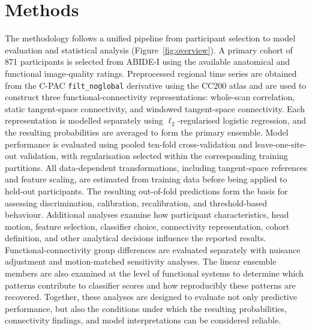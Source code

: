 \section{Methods}
\label{sec:methods}

The methodology follows a unified pipeline from participant selection to model evaluation and statistical analysis (Figure~\ref{fig:overview}). A primary cohort of 871 participants is selected from ABIDE-I using the available anatomical and functional image-quality ratings. Preprocessed regional time series are obtained from the C-PAC \texttt{filt\_noglobal} derivative using the CC200 atlas and are used to construct three functional-connectivity representations: whole-scan correlation, static tangent-space connectivity, and windowed tangent-space connectivity. Each representation is modelled separately using $\ell_2$-regularised logistic regression, and the resulting probabilities are averaged to form the primary ensemble. Model performance is evaluated using pooled ten-fold cross-validation and leave-one-site-out validation, with regularisation selected within the corresponding training partitions. All data-dependent transformations, including tangent-space references and feature scaling, are estimated from training data before being applied to held-out participants. The resulting out-of-fold predictions form the basis for assessing discrimination, calibration, recalibration, and threshold-based behaviour. Additional analyses examine how participant characteristics, head motion, feature selection, classifier choice, connectivity representation, cohort definition, and other analytical decisions influence the reported results. Functional-connectivity group differences are evaluated separately with nuisance adjustment and motion-matched sensitivity analyses. The linear ensemble members are also examined at the level of functional systems to determine which patterns contribute to classifier scores and how reproducibly these patterns are recovered. Together, these analyses are designed to evaluate not only predictive performance, but also the conditions under which the resulting probabilities, connectivity findings, and model interpretations can be considered reliable.

